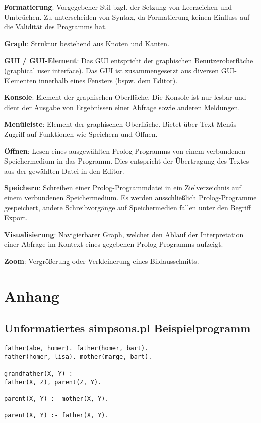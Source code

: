 \documentclass[parskip=full,11pt,twoside]{scrartcl}
\begin{document}
\textbf{Formatierung}:
Vorgegebener Stil bzgl. der Setzung von Leerzeichen und Umbrüchen. Zu unterscheiden von Syntax, da Formatierung keinen Einfluss auf die Validität des Programms hat.

\textbf{Graph}:
Struktur bestehend aus Knoten und Kanten.

\textbf{GUI / GUI-Element}:
Das GUI entspricht der graphischen Benutzeroberfläche (graphical user interface). Das GUI ist zusammengesetzt aus diversen GUI-Elementen innerhalb eines Fensters (bspw. dem Editor).

\textbf{Konsole}:
Element der graphischen Oberfläche. Die Konsole ist nur lesbar und dient der Ausgabe von Ergebnissen einer Abfrage sowie anderen Meldungen. 

\textbf{Menüleiste}:
Element der graphischen Oberfläche. Bietet über Text-Menüs Zugriff auf Funktionen wie Speichern und Öffnen.

\textbf{Öffnen}:
Lesen eines ausgewählten Prolog-Programms von einem verbundenen Speichermedium in das Programm. Dies entspricht der Übertragung des Textes aus der gewählten Datei in den Editor.

\textbf{Speichern}:
Schreiben einer Prolog-Programmdatei in ein Zielverzeichnis auf einem verbundenen Speichermedium. Es werden ausschließlich Prolog-Programme gespeichert, andere Schreibvorgänge auf Speichermedien fallen unter den Begriff Export.

\textbf{Visualisierung}:
Navigierbarer Graph, welcher den Ablauf der Interpretation einer Abfrage im Kontext eines gegebenen Prolog-Programms aufzeigt.

\textbf{Zoom}:
Vergrößerung oder Verkleinerung eines Bildausschnitts.

\newpage
\section{Anhang}

\subsection{Unformatiertes simpsons.pl Beispielprogramm}

\begin{lstlisting}
father(abe, homer). father(homer, bart).
father(homer, lisa). mother(marge, bart).

grandfather(X, Y) :-
father(X, Z), parent(Z, Y).

parent(X, Y) :- mother(X, Y).

parent(X, Y) :- father(X, Y).
\end{lstlisting}
\end{document}
